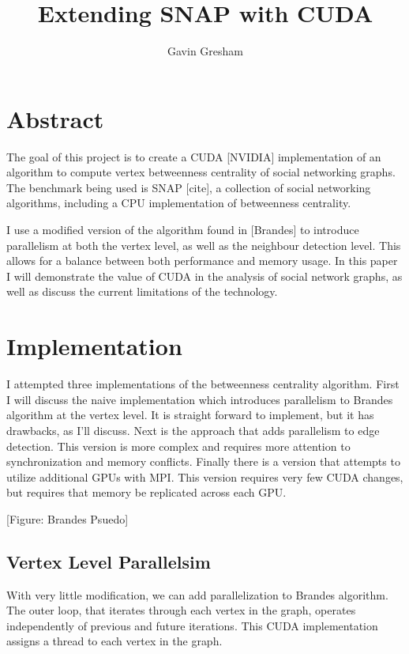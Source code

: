 \documentclass[12pt,twocolumn]{article}
\begin{document}
\title{Extending SNAP with CUDA}
\author{Gavin Gresham}
\maketitle

\section{Abstract}
The goal of this project is to create a CUDA [NVIDIA] implementation of an algorithm to compute vertex betweenness centrality of social networking graphs. The benchmark being used is SNAP [cite], a collection of social networking algorithms, including a CPU implementation of betweenness centrality. 
 
I use a modified version of the algorithm found in [Brandes] to introduce parallelism at both the vertex level, as well as the neighbour detection level. This allows for a balance between both performance and memory usage. In this paper I will demonstrate the value of CUDA in the analysis of social network graphs, as well as discuss the current limitations of the technology.
 
\section{Implementation}
I attempted three implementations of the betweenness centrality algorithm. First I will discuss the naive implementation which introduces parallelism to Brandes algorithm at the vertex level. It is straight forward to implement, but it has drawbacks, as I'll discuss. Next is the approach that adds parallelism to edge detection. This version is more complex and requires more attention to synchronization and memory conflicts. Finally there is a version that attempts to utilize additional GPUs with MPI. This version requires very few CUDA changes, but requires that memory be replicated across each GPU.
 
[Figure: Brandes Psuedo]
 
\subsection{Vertex Level Parallelsim}
With very little modification, we can add parallelization to Brandes algorithm. The outer loop, that iterates through each vertex in the graph, operates independently of previous and future iterations. This CUDA implementation assigns a thread to each vertex in the graph.
 
\end{document}
